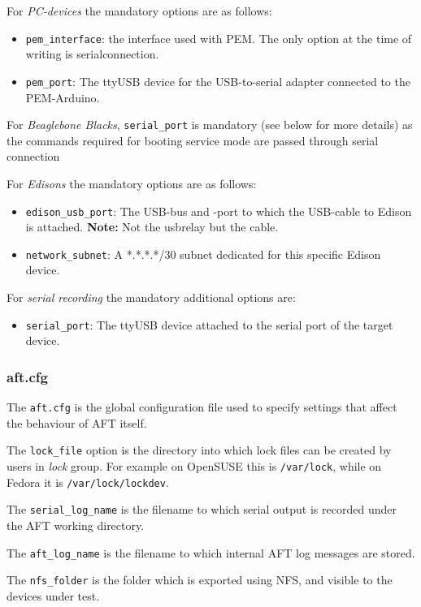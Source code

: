 \documentclass[a4paper,11pt]{article}
\newcommand{\note}{\textbf{Note: }}
\newcommand{\cmd}[1]{\texttt{#1}}
\begin{document}
For \emph{PC-devices} the mandatory options are as follows:
\begin{itemize}
\item \cmd{pem\_interface}: the interface used with PEM. The only option at the time of writing is serialconnection.
\item \cmd{pem\_port}: The ttyUSB device for the USB-to-serial adapter connected to the PEM-Arduino.
\end{itemize}

For \emph{Beaglebone Blacks}, \cmd{serial\_port} is mandatory (see below for more details) as the commands required for booting service mode are passed through serial connection

For \emph{Edisons} the mandatory options are as follows:
\begin{itemize}
\item \cmd{edison\_usb\_port}: The USB-bus and -port to which the USB-cable to Edison is attached. \note Not the usbrelay but the cable.

\item \cmd{network\_subnet}: A *.*.*.*/30 subnet dedicated for this specific Edison device.
\end{itemize}

For \emph{serial recording} the mandatory additional options are:

\begin{itemize}
	\item \cmd{serial\_port}: The ttyUSB device attached to the serial port of the target device.
\end{itemize}

\subsubsection*{aft.cfg}
The \cmd{aft.cfg} is the global configuration file used to specify settings that affect the behaviour of AFT itself.

The \cmd{lock\_file} option is the directory into which lock files can be created by users in \emph{lock} group. For example on OpenSUSE this is \cmd{/var/lock}, while on Fedora it is \cmd{/var/lock/lockdev}.

The \cmd{serial\_log\_name} is the filename to which serial output is recorded under the AFT working directory.

The \cmd{aft\_log\_name} is the filename to which internal AFT log messages are stored.

The \cmd{nfs\_folder} is the folder which is exported using NFS, and visible to the devices under test.
\end{document}
